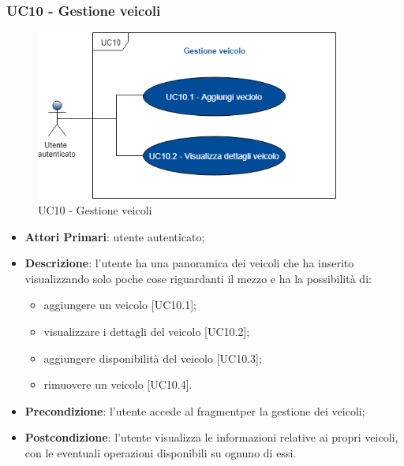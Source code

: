 \subsubsection{UC10 - Gestione veicoli}
  \begin{figure}[H]
 	\includegraphics[width=10cm]{res/images/UC10Gestioneveicolo.png}
 	\centering
 	\caption{UC10 - Gestione veicoli}
 \end{figure}
 \begin{itemize}
 	\item \textbf{Attori Primari}: utente autenticato;
 	\item \textbf{Descrizione}: l'utente ha una panoramica dei veicoli che ha inserito visualizzando solo poche cose riguardanti il mezzo e ha la possibilità di:
 	\begin{itemize}
 		\item aggiungere un veicolo [UC10.1];
 		\item visualizzare i dettagli del veicolo [UC10.2];
 		\item aggiungere disponibilità del veicolo [UC10.3];
 		\item rimuovere un veicolo [UC10.4].
 	\end{itemize}
 	\item \textbf{Precondizione}: l'utente accede al fragment\glosp per la gestione dei veicoli;
 	\item \textbf{Postcondizione}: l'utente visualizza le informazioni relative ai propri veicoli, con le eventuali operazioni disponibili su ognuno di essi.
 \end{itemize}
